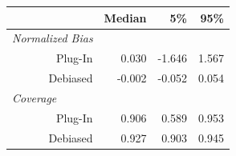 
\begin{tabular}{r|rrr}
\toprule
  & Median & 5\% & 95\%\\
\midrule
\multicolumn{1}{l|}{\textit{Normalized Bias}}\\
Plug-In & 0.030 & -1.646 & 1.567\\
Debiased & -0.002 & -0.052 & 0.054\\
\midrule
\multicolumn{1}{l|}{\textit{Coverage}}\\
Plug-In & 0.906 & 0.589 & 0.953\\
Debiased & 0.927 & 0.903 & 0.945\\
\bottomrule
\end{tabular}
